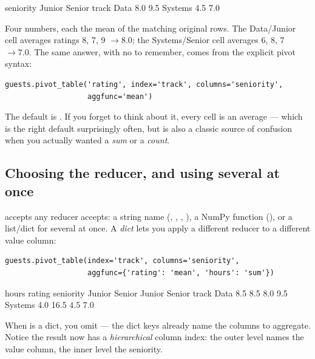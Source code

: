 \documentclass[11pt]{article}
\begin{document}
\begin{outblock}
seniority   Junior  Senior
track
Data           8.0     9.5
Systems        4.5     7.0
\end{outblock}

Four numbers, each the mean of the matching original rows. The Data/Junior cell averages ratings 8, 7, 9 $\to 8.0$; the Systems/Senior cell averages 6, 8, 7 $\to 7.0$. The same answer, with no  to remember, comes from the explicit pivot syntax:

\begin{lstlisting}
guests.pivot_table('rating', index='track', columns='seniority',
                   aggfunc='mean')
\end{lstlisting}

\begin{keyidea}
The default  is . If you forget to think about it, every cell is an average --- which is the right default surprisingly often, but is also a classic source of confusion when you actually wanted a \emph{sum} or a \emph{count}.
\end{keyidea}

\subsection{Choosing the reducer, and using several at once}

 accepts any reducer  accepts: a string name (, , , ), a NumPy function (), or a list/dict for several at once. A \emph{dict} lets you apply a different reducer to a different value column:

\begin{lstlisting}
guests.pivot_table(index='track', columns='seniority',
                   aggfunc={'rating': 'mean', 'hours': 'sum'})
\end{lstlisting}

\begin{outblock}
            hours          rating
seniority  Junior  Senior  Junior  Senior
track
Data          8.5     8.5     8.0     9.5
Systems       4.0    16.5     4.5     7.0
\end{outblock}

When  is a dict, you omit  --- the dict keys already name the columns to aggregate. Notice the result now has a \emph{hierarchical} column index: the outer level names the value column, the inner level the seniority.
\end{document}
